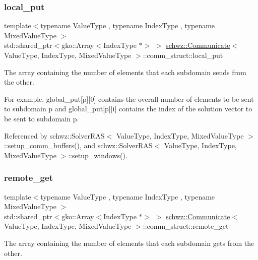 \subsubsection{\texorpdfstring{local\+\_\+put}{local\_put}}
{\footnotesize\ttfamily template$<$typename Value\+Type , typename Index\+Type , typename Mixed\+Value\+Type $>$ \\
std\+::shared\+\_\+ptr$<$gko\+::\+Array$<$Index\+Type $\ast$$>$ $>$ \hyperlink{classschwz_1_1Communicate}{schwz\+::\+Communicate}$<$ Value\+Type, Index\+Type, Mixed\+Value\+Type $>$\+::comm\+\_\+struct\+::local\+\_\+put}



The array containing the number of elements that each subdomain sends from the other. 

For example. global\+\_\+put\mbox{[}p\mbox{]}\mbox{[}0\mbox{]} contains the overall number of elements to be sent to subdomain p and global\+\_\+put\mbox{[}p\mbox{]}\mbox{[}i\mbox{]} contains the index of the solution vector to be sent to subdomain p. 

Referenced by schwz\+::\+Solver\+R\+A\+S$<$ Value\+Type, Index\+Type, Mixed\+Value\+Type $>$\+::setup\+\_\+comm\+\_\+buffers(), and schwz\+::\+Solver\+R\+A\+S$<$ Value\+Type, Index\+Type, Mixed\+Value\+Type $>$\+::setup\+\_\+windows().

\mbox{\label{structschwz_1_1Communicate_1_1comm__struct_a70f57e5c0ab445089ca9d8bdc0fa3838}} 
\subsubsection{\texorpdfstring{remote\+\_\+get}{remote\_get}}
{\footnotesize\ttfamily template$<$typename Value\+Type , typename Index\+Type , typename Mixed\+Value\+Type $>$ \\
std\+::shared\+\_\+ptr$<$gko\+::\+Array$<$Index\+Type $\ast$$>$ $>$ \hyperlink{classschwz_1_1Communicate}{schwz\+::\+Communicate}$<$ Value\+Type, Index\+Type, Mixed\+Value\+Type $>$\+::comm\+\_\+struct\+::remote\+\_\+get}



The array containing the number of elements that each subdomain gets from the other. 

